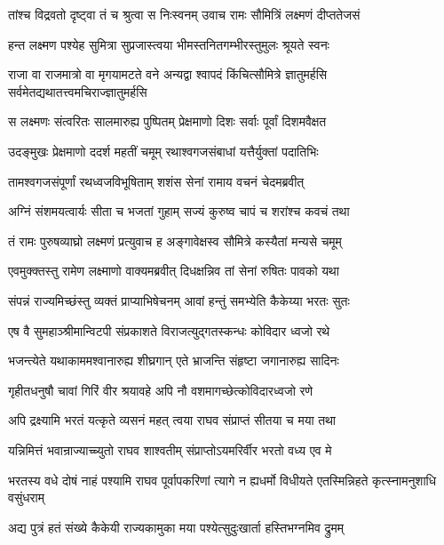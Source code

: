 \twolineshloka
{तांश्च विद्रवतो दृष्ट्वा तं च श्रुत्वा स निःस्वनम्}
{उवाच रामः सौमित्रिं लक्ष्मणं दीप्ततेजसं} %

\twolineshloka
{हन्त लक्ष्मण पश्येह सुमित्रा सुप्रजास्त्वया}
{भीमस्तनितगम्भीरस्तुमुलः श्रूयते स्वनः} %

\threelineshloka
{राजा वा राजमात्रो वा मृगयामटते वने}
{अन्यद्वा श्वापदं किंचित्सौमित्रे ज्ञातुमर्हसि}
{सर्वमेतद्यथातत्त्वमचिराज्ज्ञातुमर्हसि} %

\twolineshloka
{स लक्ष्मणः संत्वरितः सालमारुह्य पुष्पितम्}
{प्रेक्षमाणो दिशः सर्वाः पूर्वां दिशमवैक्षत} %

\twolineshloka
{उदङ्मुखः प्रेक्षमाणो ददर्श महतीं चमूम्}
{रथाश्वगजसंबाधां यत्तैर्युक्तां पदातिभिः} %

\twolineshloka
{तामश्वगजसंपूर्णां रथध्वजविभूषिताम्}
{शशंस सेनां रामाय वचनं चेदमब्रवीत्} %

\twolineshloka
{अग्निं संशमयत्वार्यः सीता च भजतां गुहाम्}
{सज्यं कुरुष्व चापं च शरांश्च कवचं तथा} %

\twolineshloka
{तं रामः पुरुषव्याघ्रो लक्ष्मणं प्रत्युवाच ह}
{अङ्गावेक्षस्व सौमित्रे कस्यैतां मन्यसे चमूम्} %

\twolineshloka
{एवमुक्क्तस्तु रामेण लक्ष्माणो वाक्यमब्रवीत्}
{दिधक्षन्निव तां सेनां रुषितः पावको यथा} %

\twolineshloka
{संपन्नं राज्यमिच्छंस्तु व्यक्तं प्राप्याभिषेचनम्}
{आवां हन्तुं समभ्येति कैकेय्या भरतः सुतः} %

\twolineshloka
{एष वै सुमहाञ्श्रीमान्विटपी संप्रकाशते}
{विराजत्युद्गतस्कन्धः कोविदार ध्वजो रथे} %

\twolineshloka
{भजन्त्येते यथाकाममश्वानारुह्य शीघ्रगान्}
{एते भ्राजन्ति संहृष्टा जगानारुह्य सादिनः} %

\twolineshloka
{गृहीतधनुषौ चावां गिरिं वीर श्रयावहे}
{अपि नौ वशमागच्छेत्कोविदारध्वजो रणे} %

\twolineshloka
{अपि द्रक्ष्यामि भरतं यत्कृते व्यसनं महत्}
{त्वया राघव संप्राप्तं सीतया च मया तथा} %

\twolineshloka
{यन्निमित्तं भवान्राज्याच्च्युतो राघव शाश्वतीम्}
{संप्राप्तोऽयमरिर्वीर भरतो वध्य एव मे} %

\threelineshloka
{भरतस्य वधे दोषं नाहं पश्यामि राघव}
{पूर्वापकरिणां त्यागे न ह्यधर्मो विधीयते}
{एतस्मिन्निहते कृत्स्नामनुशाधि वसुंधराम्} %

\twolineshloka
{अद्य पुत्रं हतं संख्ये कैकेयी राज्यकामुका}
{मया पश्येत्सुदुःखार्ता हस्तिभग्नमिव द्रुमम्} %

